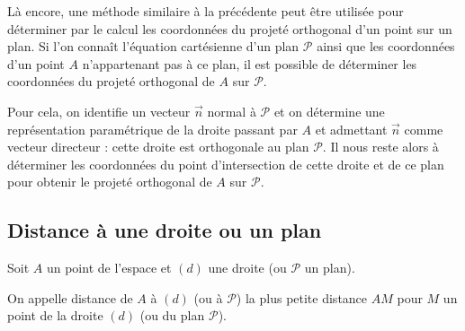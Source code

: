 \documentclass[11pt,fleqn, openany]{book} %
\begin{document}
Là encore, une méthode similaire à la précédente peut être utilisée pour déterminer par le calcul les coordonnées du projeté orthogonal d'un point sur un plan. Si l'on connaît l'équation cartésienne d'un plan $\mathcal{P}$ ainsi que les coordonnées d'un point $A$ n'appartenant pas à ce plan, il est possible de déterminer les coordonnées du projeté orthogonal de $A$ sur $\mathcal{P}$. 

Pour cela, on identifie un vecteur $\vec n$ normal à $\mathcal{P}$ et on détermine une représentation paramétrique de la droite passant par $A$ et admettant $\vec n$ comme vecteur directeur : cette droite est orthogonale au plan $\mathcal{P}$. Il nous reste alors à déterminer les coordonnées du point d'intersection de cette droite et de ce plan pour obtenir le projeté orthogonal de $A$ sur $\mathcal{P}$.

\newpage
\subsection{Distance à une droite ou un plan}

\begin{definition}Soit $A$ un point de l'espace et $(d)$ une droite (ou $\mathcal{P}$ un plan). 

On appelle distance de $A$ à $(d)$ (ou à $\mathcal{P}$) la plus petite distance $AM$ pour $M$ un point de la droite $(d)$ (ou du plan $\mathcal{P}$).\end{definition}
\end{document}
